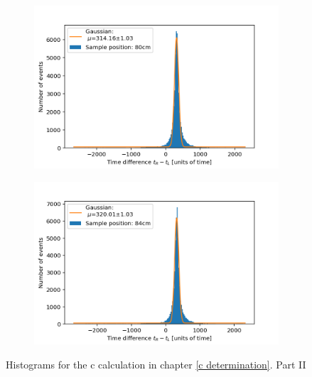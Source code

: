 \documentclass[]{article}
\begin{document}
\begin{figure}[H]
\medskip
\begin{subfigure}{0.48\textwidth}
\includegraphics[width=\linewidth]{Plots/Pos/80cm.png}
\end{subfigure}
\begin{subfigure}[c]{0.48\linewidth}
\includegraphics[width=\linewidth]{Plots/Pos/84cm.png}
\end{subfigure}
\caption{Histograms for the c calculation in chapter \ref{c determination}. Part II }
\end{figure}
\end{document}
